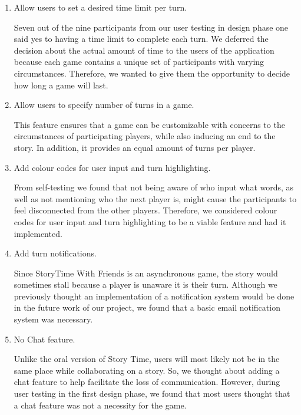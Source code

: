 \documentclass{sigchi}
\begin{document}
\begin{enumerate}[leftmargin=.15in,noitemsep]
\item Allow users to set a desired time limit per turn.\newline 

Seven out of the nine participants from our user testing in design phase one said yes to having a time limit to complete each turn. We deferred the decision about the actual amount of time to the users of the application because each game contains a unique set of participants with varying circumstances. Therefore, we wanted to give them the opportunity to decide how long a game will last.\newline

\item Allow users to specify number of turns in a game.\newline 

This feature ensures that a game can be customizable with concerns to the circumstances of participating players, while also inducing an end to the story. In addition, it provides an equal amount of turns per player.\newline 

\item Add colour codes for user input and turn highlighting.\newline

From self-testing we found that not being aware of who input what words, as well as not mentioning who the next player is, might cause the participants to feel disconnected from the other players. Therefore, we considered colour codes for user input and turn highlighting to be a viable feature and had it implemented.\newline

\item Add turn notifications.\newline

Since StoryTime With Friends is an asynchronous game, the story would sometimes stall because a player is unaware it is their turn. Although we previously thought an implementation of a notification system would be done in the future work of our project, we found that a basic email notification system was necessary. \newline

\item No Chat feature.\newline

Unlike the oral version of Story Time, users will most likely not be in the same place while collaborating on a story. So, we thought about adding a chat feature to help facilitate the loss of communication. However, during user testing in the first design phase, we found that most users thought that a chat feature was not a necessity for the game. 

\end{enumerate}
\end{document}
